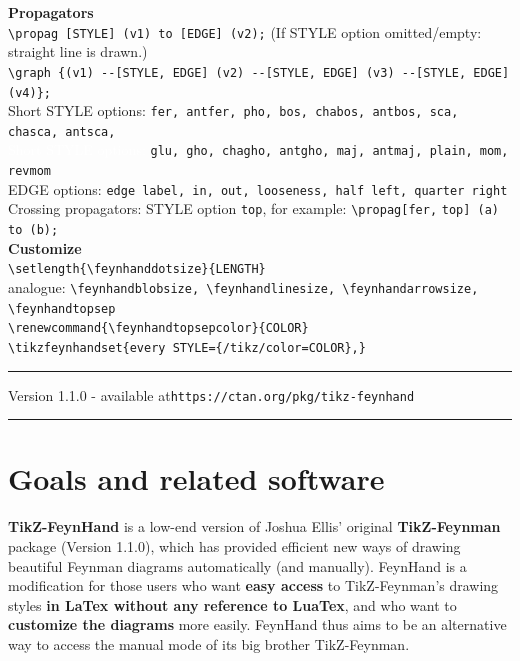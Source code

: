 \documentclass[10pt,letterpaper,twoside,notitlepage]{article}
\numberwithin{figure}{section}
\begin{document}
%
\noindent
\textbf{Propagators}\\
\vercol\verb!\propag [STYLE] (v1) to [EDGE] (v2);!\txcol\qquad\qquad
(If STYLE option omitted/empty: straight line is drawn.)\\
\vercol\verb!\graph {(v1) --[STYLE, EDGE] (v2) --[STYLE, EDGE] (v3) --[STYLE, EDGE] (v4)};!\txcol
\\[1mm]
Short STYLE options: \vercol\verb!fer, antfer, pho, bos, chabos, antbos, sca, chasca, antsca,!\\ 
\textcolor{white}{Short STYLE options:} 
\verb!glu, gho, chagho, antgho, maj, antmaj, plain, mom, revmom!\txcol\\
EDGE options: \vercol\verb!edge label, in, out, looseness, half left, quarter right!\txcol
\\
Crossing propagators:\quad
STYLE option \redcol\verb!top!\txcol, 
for example: \vercol\verb!\propag[fer,! \redcol\verb!top!\vercol\verb!] (a) to (b);!\txcol
\vspace{1.5mm}\\
%
\noindent
\textbf{Customize}\\
\blucol\verb!\setlength{\feynhanddotsize}{LENGTH}!\txcol\\
analogue: 
\blucol\verb!\feynhandblobsize, \feynhandlinesize, \feynhandarrowsize, \feynhandtopsep!\txcol\\
\blucol\verb!\renewcommand{\feynhandtopsepcolor}{COLOR}!\txcol\\
\blucol\verb!\tikzfeynhandset{every STYLE={/tikz/color=COLOR},}!\txcol\\
\vspace{0mm}
%
\hrule
\vspace{2mm}

{\centering Version 1.1.0 - 
 available at\qquad  \texttt{https://ctan.org/pkg/tikz-feynhand}\\}

\vspace{1mm}

\hrule
%
\vspace{-2mm}
\tableofcontents
%
%
%
%
\section{Goals and related software}
\label{sec:_goals}
%
\noindent
\textbf{TikZ-FeynHand} is a low-end version of Joshua Ellis' original
\textbf{TikZ-Feynman} package \cite{tikzfeynman} (Version 1.1.0),
which has provided efficient new ways of drawing beautiful Feynman diagrams automatically 
(and manually).
FeynHand is a modification for those users who want \textbf{easy access} to TikZ-Feynman's
drawing styles \textbf{in LaTex without any reference to LuaTex},
and who want to \textbf{customize the diagrams} more easily.
FeynHand thus aims to be an alternative way to access
the manual mode of its big brother TikZ-Feynman.
\end{document}

